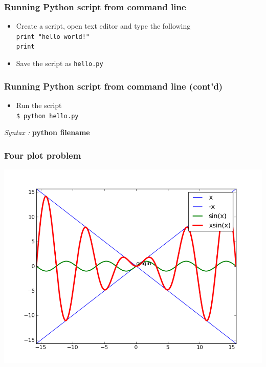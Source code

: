\documentclass[17pt,compress]{beamer}
\begin{document}
\begin{frame}[fragile]
\frametitle{Running Python script from command line}
\label{sec-4}

\begin{itemize}
\item Create a script, open text editor and type the following\\\pause
     \texttt{print "hello world!"}\\
     \texttt{print}\pause
\item Save the script as \texttt{hello.py}
\end{itemize}
\end{frame}
\begin{frame}[fragile]
\frametitle{Running Python script from command line (cont'd)}
\label{sec-5}


\begin{itemize}
\item Run the script\\
     \texttt{\$ python hello.py}
\end{itemize}
  \emph{Syntax :} \textbf{python filename}
\end{frame}
\begin{frame}
\frametitle{Four plot problem}
\label{sec-6}

    \begin{center}
      \includegraphics[scale=0.4]{four_plot}    
    \end{center}
\end{frame}
\end{document}
